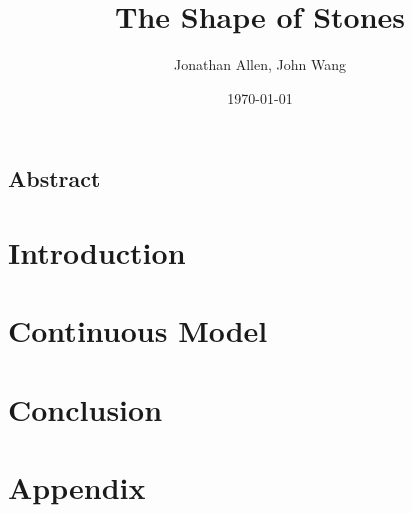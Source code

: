 \documentclass[12pt]{amsart}   %
\begin{document}
\graphicspath{ {figures/} }

\title[Shape of Stones]{The Shape of Stones}
 
\author{Jonathan Allen, John Wang}
\date{\today}

\maketitle

\subsection*{Abstract}

\section{Introduction}


% 

\section{Continuous Model}


\section{Conclusion}


\section*{Appendix}


% 
\end{document}
